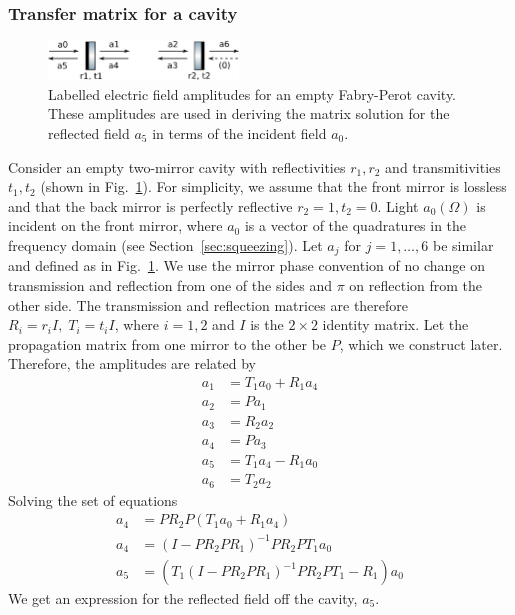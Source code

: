 \documentclass[aps,pra,superscriptaddress,reprint,nofootinbib]{revtex4-1}
\begin{document}
\subsubsection{Transfer matrix for a cavity}

\begin{figure}[ht]
	\begin{center}
	\includegraphics[width=0.45\textwidth]{figures/empty_cavity_amplitudes.pdf}
	\end{center}
	\caption{Labelled electric field amplitudes for an empty Fabry-Perot cavity. These amplitudes are used in deriving the matrix solution for the reflected field $a_5$ in terms of the incident field $a_0$.}
	\label{fig:empty_cavity_amplitudes}
\end{figure}

Consider an empty two-mirror cavity with reflectivities $r_1, r_2$ and transmitivities $t_1, t_2$ (shown in Fig.~\ref{fig:empty_cavity_amplitudes}). For simplicity, we assume that the front mirror is lossless and that the back mirror is perfectly reflective $r_2 = 1, t_2 = 0$. Light $a_0(\Omega)$ is incident on the front mirror, where $a_0$ is a vector of the quadratures in the frequency domain (see Section~\ref{sec:squeezing}). Let $a_j$ for $j = 1, \ldots, 6$ be similar and defined as in Fig.~\ref{fig:empty_cavity_amplitudes}. We use the mirror phase convention of no change on transmission and reflection from one of the sides and $\pi$ on reflection from the other side. The transmission and reflection matrices are therefore $R_i = r_i I,\; T_i = t_i I$, where $i = 1, 2$ and $I$ is the $2 \times 2$ identity matrix. Let the propagation matrix from one mirror to the other be $P$, which we construct later. Therefore, the amplitudes are related by
\begin{align}
a_1 &= T_1 a_0 + R_1 a_4\\
a_2 &= P a_1\nonumber\\
a_3 &= R_2 a_2 \nonumber\\
a_4 &= P a_3\nonumber\\
a_5 &= T_1 a_4 - R_1 a_0\nonumber\\
a_6 &= T_2 a_2\nonumber
\end{align}
Solving the set of equations
\begin{align}
a_4 &= P R_2 P (T_1 a_0 + R_1 a_4) \\
a_4 &= (I - P R_2 P R_1)^{-1} P R_2 P T_1 a_0 \nonumber\\
a_5 &= \left(T_1 (I - P R_2 P R_1)^{-1} P R_2 P T_1 - R_1\right) a_0
\label{eq:empty_cav_refl}
\end{align}
We get an expression for the reflected field off the cavity, $a_5$.
\end{document}
